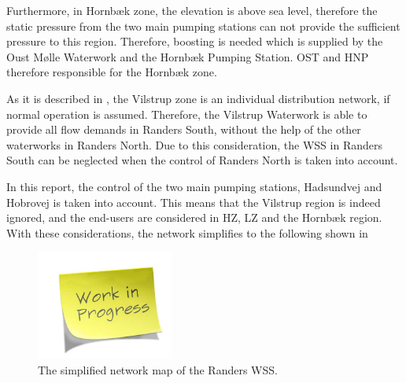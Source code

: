 Furthermore, in Hornbæk zone, the elevation is above sea level, therefore the static pressure from the two main pumping stations can not provide the sufficient pressure to this region. Therefore, boosting is needed which is supplied by the Oust Mølle Waterwork and the Hornbæk Pumping Station. OST and HNP therefore responsible for the Hornbæk zone.

As it is described in , the Vilstrup zone is an individual distribution network, if normal operation is assumed. Therefore, the Vilstrup Waterwork is able to provide all flow demands in Randers South, without the help of the other waterworks in Randers North. Due to this consideration, the WSS in Randers South can be neglected when the control of Randers North is taken into account. 

In this report, the control of the two main pumping stations, Hadsundvej and Hobrovej is taken into account. This means that the Vilstrup region is indeed ignored, and the end-users are considered in HZ, LZ and the Hornbæk region. With these considerations, the network simplifies to the following shown in 

\begin{figure}[H]
\centering
\includegraphics[width=0.4\textwidth]{report/pictures/missingfigure}
\caption{The simplified network map of the Randers WSS.}
\label{fig:simplified_network}
\end{figure}









